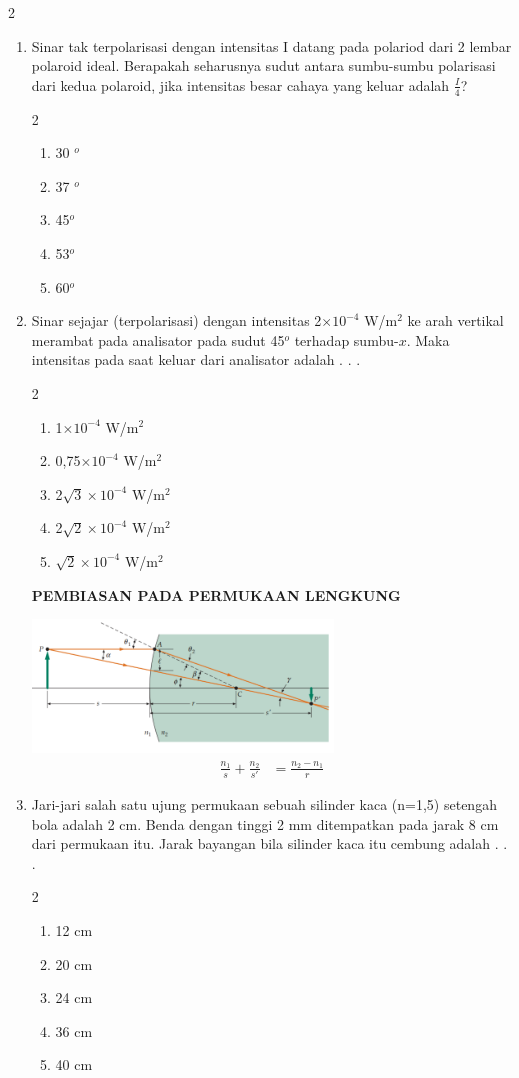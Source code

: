 \documentclass[11pt,a4paper]{extarticle}
\newcommand{\pilgani}[1]{                            \vspace{-0.3cm}\begin{multicols}{2}
 \begin{enumerate}[label=\Alph*., itemsep=0pt,topsep=0pt,leftmargin=*,align=Center]#1                     \end{enumerate}
 \phantom{ini cuma sapi, wedus, dan ayam}
 \end{multicols}}
\begin{document}
\begin{multicols*}{2}
\begin{enumerate}
\item Sinar tak terpolarisasi dengan intensitas I datang pada polariod dari 2 lembar polaroid ideal. Berapakah seharusnya sudut antara sumbu-sumbu polarisasi dari kedua polaroid, jika intensitas besar cahaya yang keluar adalah $\frac{I}{4}$?
\pilgani{
        \item 30 $^o$
        \item 37 $^o$
        \item 45$^o$
        \item 53$^o$
        \item 60$^o$
        }
\vspace{2cm}
\item Sinar sejajar (terpolarisasi) dengan intensitas 2$\times 10^{-4}$ W/m$^2$ ke arah vertikal merambat pada analisator pada sudut 45$^o$ terhadap sumbu-$x$. Maka intensitas pada saat keluar dari analisator adalah . . . 
\pilgani{
        \item 1$\times 10^{-4}$ W/m$^2$
        \item 0,75$\times 10^{-4}$ W/m$^2$
        \item 2$\sqrt{3}\times 10^{-4}$ W/m$^2$
        \item 2$\sqrt{2}\times 10^{-4}$ W/m$^2$
        \item $\sqrt{2}\times 10^{-4}$ W/m$^2$
        }
\vspace{2cm}
        
\textbf{PEMBIASAN PADA PERMUKAAN LENGKUNG}
\graphicspath{ {pic/} }
\includegraphics[width=8cm]{rumuslensasingle}
\begin{align*}
\frac{n_1}{s}+\frac{n_2}{s'}&=\frac{n_2-n_1}{r}
\end{align*}

\item Jari-jari salah satu ujung permukaan sebuah silinder kaca (n=1,5) setengah bola adalah 2 cm. Benda dengan tinggi 2 mm ditempatkan pada jarak 8 cm dari permukaan itu. Jarak bayangan bila silinder kaca itu cembung adalah . . .
\pilgani{
        \item 12 cm
        \item 20 cm
        \item 24 cm
        \item 36 cm
        \item 40 cm
        }


\end{enumerate}
\end{multicols*}
\end{document}
